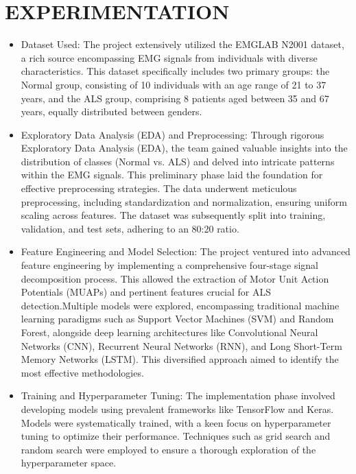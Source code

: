 \documentclass[ 12pt,a4paper,twocolumn,fleqn]{report}
\begin{document}
\chapter{EXPERIMENTATION}
\begin{itemize}
    \item Dataset Used: The project extensively utilized the EMGLAB N2001 dataset, a rich source
encompassing EMG signals from individuals with diverse characteristics. This dataset
specifically includes two primary groups: the Normal group, consisting of 10 individuals with
an age range of 21 to 37 years, and the ALS group, comprising 8 patients aged between 35 and
67 years, equally distributed between genders.
\item Exploratory Data Analysis (EDA) and Preprocessing: Through rigorous Exploratory
Data Analysis (EDA), the team gained valuable insights into the distribution of classes (Normal
vs. ALS) and delved into intricate patterns within the EMG signals. This preliminary phase laid
the foundation for effective preprocessing strategies. The data underwent meticulous
preprocessing, including standardization and normalization, ensuring uniform scaling across
features. The dataset was subsequently split into training, validation, and test sets, adhering to
an 80:20 ratio.
\item Feature Engineering and Model Selection: The project ventured into advanced feature
engineering by implementing a comprehensive four-stage signal decomposition process. This
allowed the extraction of Motor Unit Action Potentials (MUAPs) and pertinent features crucial
for ALS detection.Multiple models were explored, encompassing traditional machine learning
paradigms such as Support Vector Machines (SVM) and Random Forest, alongside deep
learning architectures like Convolutional Neural Networks (CNN), Recurrent Neural Networks
(RNN), and Long Short-Term Memory Networks (LSTM). This diversified approach aimed to
identify the most effective methodologies.
\item Training and Hyperparameter Tuning: The implementation phase involved developing
models using prevalent frameworks like TensorFlow and Keras. Models were systematically
trained, with a keen focus on hyperparameter tuning to optimize their performance. Techniques
such as grid search and random search were employed to ensure a thorough exploration of the
hyperparameter space.
\end{itemize}
\newpage
  \pagestyle{fancy}
\thisfancypage{%
  \setlength{\fboxsep}{20pt}\doublebox}{}
\normalsize
\end{document}
